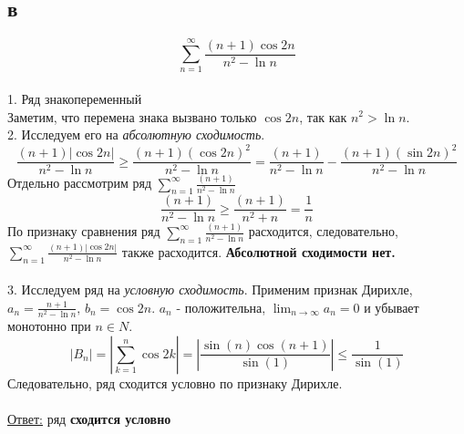 \documentclass[a5paper, 10pt]{article}
\theoremstyle{definition}
\theoremstyle{plain}
\theoremstyle{remark}
\begin{document}
\subsection{в}
\begin{equation}
\sum \limits_{n = 1}^{\infty} \frac{\left(n+1\right) \cos 2n}{n^2-\ln n}
\end{equation}
\\
1. Ряд знакопеременный\\
Заметим, что перемена знака вызвано только $\cos 2n$, так как $n^2 > \ln n$.\\
2. Исследуем его на \textit{абсолютную сходимость}. \\
\begin{equation}
\frac{\left(n+1\right) \left| \cos 2n \right|}{n^2-\ln n} \geq \frac{\left(n+1\right) \left( \cos 2n \right)^2}{n^2-\ln n}=
\frac{\left(n+1\right)}{n^2-\ln n} - \frac{\left(n+1\right) \left( \sin 2n \right)^2}{n^2-\ln n}
\end{equation}
Отдельно рассмотрим ряд $\sum \limits_{n = 1}^{\infty} \frac{\left(n+1\right)}{n^2-\ln n}$
\begin{equation}
\frac{\left(n+1\right)}{n^2-\ln n} \geq \frac{\left(n+1\right)}{n^2+ n}=  \frac{1}{n}
\end{equation}
По признаку сравнения ряд $\sum \limits_{n = 1}^{\infty} \frac{\left(n+1\right)}{n^2-\ln n}$ расходится, следовательно, $\sum \limits_{n = 1}^{\infty} \frac{\left(n+1\right) \left| \cos 2n \right|}{n^2-\ln n}$ также расходится. \textbf{Абсолютной сходимости нет.}\\\\
3. Исследуем ряд на \textit{условную сходимость}.
Применим признак Дирихле, $a_n = \frac{n+1}{n^2 - \ln n}, \, b_n = \cos 2n$. $a_n$ - положительна, $\lim_{n \to \infty} a_n = 0$ и убывает монотонно при $n \in N$.
\begin{equation}
\left| B_n \right| = \left| \sum \limits_{k = 1}^{n}\cos 2k\right| = \left| \frac{\sin(n)\cos(n+1)}{\sin(1)} \right|  \leq \frac{1}{\sin(1)}
\end{equation}
Следовательно, ряд сходится условно по признаку Дирихле.
\\\\
\underline{Ответ:} ряд  \textbf{сходится условно}


\newpage
\end{document}
